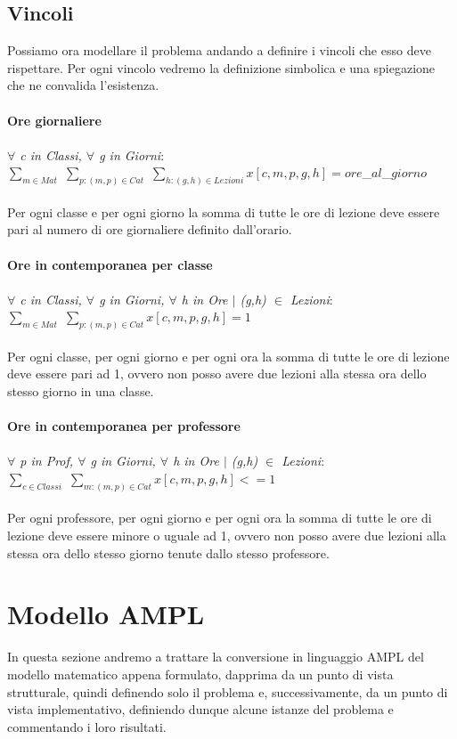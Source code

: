 \documentclass{article}
\begin{document}
\subsection{Vincoli}
Possiamo ora modellare il problema andando a definire i vincoli che esso deve rispettare. Per ogni vincolo vedremo la definizione simbolica e una spiegazione che ne convalida l'esistenza.
\\\\\textbf{Ore giornaliere}
	\\\\\emph{$\forall$ c in Classi, $\forall$ g in Giorni}: 
	\\$\sum_{m \in Mat}$ $\sum_{p : (m,p) \in Cat}$ $\sum_{h :(g,h)\in Lezioni}x[c,m,p,g,h] = ore$\_$al$\_$giorno$
\\\\Per ogni classe e per ogni giorno la somma di tutte le ore di lezione deve essere pari al numero di ore giornaliere definito dall'orario.
\\\\\textbf{Ore in contemporanea per classe}
	\\\\\emph{$\forall$ c in Classi, $\forall$ g in Giorni, $\forall$ h in Ore $\mid$ (g,h)  $\in$ Lezioni}: 
	\\$\sum_{m \in Mat}$ $\sum_{p : (m,p) \in Cat}x[c,m,p,g,h] = 1$
\\\\Per ogni classe, per ogni giorno e per ogni ora la somma di tutte le ore di lezione deve essere pari ad 1, ovvero non posso avere due lezioni alla stessa ora dello stesso giorno in una classe.
\\\\\textbf{Ore in contemporanea per professore}
	\\\\\emph{$\forall$ p in Prof, $\forall$ g in Giorni, $\forall$ h in Ore $\mid$ (g,h)  $\in$ Lezioni}: 
	\\$\sum_{c \in Classi}$ $\sum_{m : (m,p) \in Cat}x[c,m,p,g,h] <= 1$
\\\\Per ogni professore, per ogni giorno e per ogni ora la somma di tutte le ore di lezione deve essere minore o uguale ad 1, ovvero non posso avere due lezioni alla stessa ora dello stesso giorno tenute dallo stesso professore.
\section{Modello AMPL}
In questa sezione andremo a trattare la conversione in linguaggio AMPL del modello matematico appena formulato, dapprima da un punto di vista strutturale, quindi definendo solo il problema e, successivamente, da un punto di vista implementativo, definiendo dunque alcune istanze del problema e commentando i loro risultati.
\end{document}

